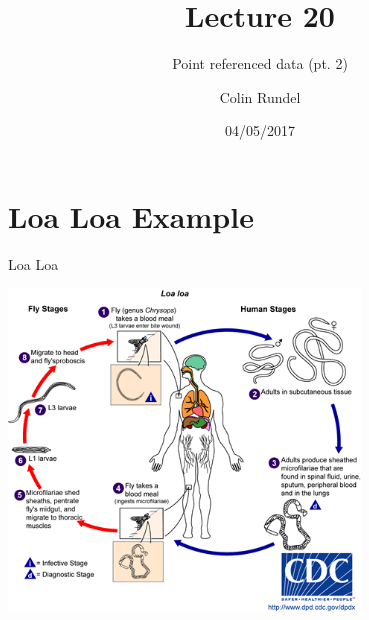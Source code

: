 \documentclass[11pt,ignorenonframetext,]{beamer}
\title{Lecture 20}
\subtitle{Point referenced data (pt. 2)}
\author{Colin Rundel}
\date{04/05/2017}
\begin{document}
\frame{\titlepage}

\hypertarget{loa-loa-example}{%
\section{Loa Loa Example}\label{loa-loa-example}}

\begin{frame}{Loa Loa}
\protect\hypertarget{loa-loa}{}

\begin{center}\includegraphics[width=0.7\textwidth]{figs/loa_loa_LifeCycle} \end{center}

\end{frame}
\end{document}
